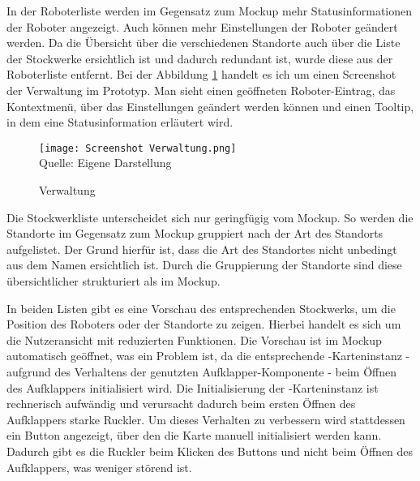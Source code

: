 In der Roboterliste werden im Gegensatz zum Mockup mehr Statusinformationen der Roboter angezeigt. Auch können mehr Einstellungen der Roboter geändert werden. Da die Übersicht über die verschiedenen Standorte auch über die Liste der Stockwerke ersichtlich ist und dadurch redundant ist, wurde diese aus der Roboterliste entfernt. Bei der Abbildung \ref{fig:RobotlistScreenshot} handelt es ich um einen Screenshot der Verwaltung im Prototyp. Man sieht einen geöffneten Roboter-Eintrag, das Kontextmenü, über das Einstellungen geändert werden können und einen Tooltip, in dem eine Statusinformation erläutert wird.

\begin{figure}[H]
    \caption{Verwaltung}\label{fig:RobotlistScreenshot}
    \texttt{[image: Screenshot Verwaltung.png]}
    \\
    Quelle: Eigene Darstellung
\end{figure}

Die Stockwerkliste unterscheidet sich nur geringfügig vom Mockup. So werden die Standorte im Gegensatz zum Mockup gruppiert nach der Art des Standorts aufgelistet. Der Grund hierfür ist, dass die Art des Standortes nicht unbedingt aus dem Namen ersichtlich ist. Durch die Gruppierung der Standorte sind diese übersichtlicher strukturiert als im Mockup.

In beiden Listen gibt es eine Vorschau des entsprechenden Stockwerks, um die Position des Roboters oder der Standorte zu zeigen. Hierbei handelt es sich um die Nutzeransicht mit reduzierten Funktionen. Die Vorschau ist im Mockup automatisch geöffnet, was ein Problem ist, da die entsprechende \deckgl{}-Karteninstanz - aufgrund des Verhaltens der genutzten Aufklapper-Komponente - beim Öffnen des Aufklappers initialisiert wird. Die Initialisierung der \deckgl{}-Karteninstanz ist rechnerisch aufwändig und verursacht dadurch beim ersten Öffnen des Aufklappers starke Ruckler. Um dieses Verhalten zu verbessern wird stattdessen ein Button angezeigt, über den die Karte manuell initialisiert werden kann. Dadurch gibt es die Ruckler beim Klicken des Buttons und nicht beim Öffnen des Aufklappers, was weniger störend ist.

